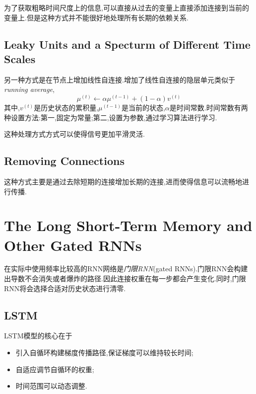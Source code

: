 为了获取粗略时间尺度上的信息,可以直接从过去的变量上直接添加连接到当前的变量上.但是这种方式并不能很好地处理所有长期的依赖关系.

\subsection{Leaky Units and a Specturm of Different Time Scales}

另一种方式是在节点上增加线性自连接.增加了线性自连接的隐层单元类似于\textit{running average},
\begin{equation}
\mu^{(t)}\leftarrow \alpha\mu^{(t-1)}+(1-\alpha)v^{(t)}
\end{equation}
其中,$v^{(t)}$是历史状态的累积量,$\mu^{(t-1)}$是当前的状态,$\alpha$是时间常数.时间常数有两种设置方法:第一,固定为常量;第二,设置为参数,通过学习算法进行学习.

这种处理方式方式可以使得信号更加平滑灵活.

\subsection{Removing Connections}

这种方式主要是通过去除短期的连接增加长期的连接,进而使得信息可以流畅地进行传播.

\section{The Long Short-Term Memory and Other Gated RNNs}

在实际中使用频率比较高的RNN网络是\textit{门限RNN}(gated RNNs).门限RNN会构建出导数不会消失或者爆炸的路径.因此连接权重在每一步都会产生变化.同时,门限RNN将会选择合适对历史状态进行清零.

\subsection{LSTM}

LSTM模型的核心在于
\begin{itemize}
    \item 引入自循环构建梯度传播路径,保证梯度可以维持较长时间;
    \item 自适应调节自循环的权重;
    \item 时间范围可以动态调整.
\end{itemize}

